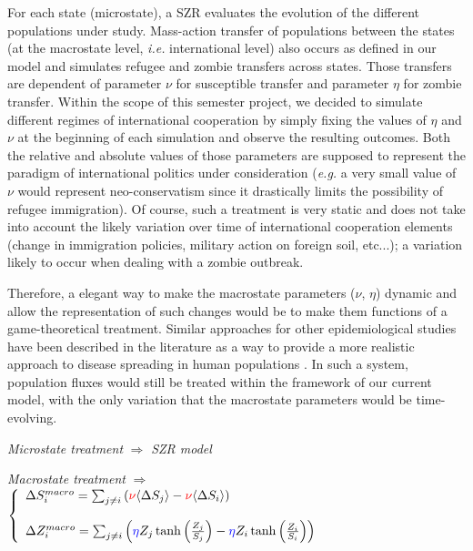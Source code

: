 \documentclass[11pt]{article} %
\begin{document}
For each state (microstate), a SZR evaluates the evolution of the different populations under study. Mass-action transfer of populations between the states (at the macrostate level, \textit{i.e.} international level) also occurs as defined in our model and simulates refugee and zombie transfers across states. Those transfers are dependent of parameter $\nu$ for susceptible transfer and parameter $\eta$ for zombie transfer. Within the scope of this semester project, we decided to simulate different regimes of international cooperation by simply fixing the values of $\eta$ and $\nu$ at the beginning of each simulation and observe the resulting outcomes. Both the relative and absolute values of those parameters are supposed to represent the paradigm of international politics under consideration (\textit{e.g.} a very small value of $\nu$ would represent neo-conservatism since it drastically limits the possibility of refugee immigration). Of course, such a treatment is very static and does not take into account the likely variation over time of international cooperation elements (change in immigration policies, military action on foreign soil, etc...); a variation likely to occur when dealing with a zombie outbreak.

Therefore, a elegant way to make the macrostate parameters ($\nu$, $\eta$) dynamic and allow the representation of such changes would be to make them functions of a game-theoretical treatment. Similar approaches for other epidemiological studies have been described in the literature as a way to provide a more realistic approach to disease spreading in human populations \cite{funk2010modelling, reluga2010game, reluga2009sis}. In such a system, population fluxes would still be treated within the framework of our current model, with the only variation that the macrostate parameters would be time-evolving. 

\bigskip

\textit{Microstate treatment} $\Rightarrow$ \textit{SZR model} 

\bigskip

\textit{Macrostate treatment} $\Rightarrow$  $\left\{
	\begin{array}{l l}
		\Delta S_{i}^{macro} =  \sum_{j\neq i}{ \left( \textcolor{red}{\nu} \langle \Delta S_{j} \rangle - \textcolor{red}{\nu}  \langle \Delta S_{i} \rangle \right) }	
    \\
    \\
    		\Delta Z_{i}^{macro} = \sum_{j\neq i}{\left( \textcolor{blue}{\eta} Z_{j}\tanh \left( \frac{Z_{j}}{S_{j}}\right) -\textcolor{blue}{\eta} Z_{i}\tanh \left( \frac{Z_{i}}{S_{i}}\right) \right)}

	\end{array} \right.$
\end{document}
